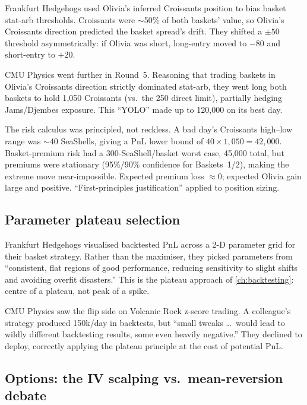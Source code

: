 Frankfurt Hedgehogs used Olivia's inferred Croissants position
to bias basket stat-arb thresholds.  Croissants were $\sim$50\%
of both baskets' value, so Olivia's Croissants direction predicted
the basket spread's drift.  They shifted a $\pm 50$ threshold
asymmetrically: if Olivia was short, long-entry moved to $-80$
and short-entry to $+20$.

CMU Physics went further in Round~5.  Reasoning that trading
baskets in Olivia's Croissants direction strictly dominated
stat-arb, they went long both baskets to hold 1{,}050 Croissants
(vs.\ the 250 direct limit), partially hedging Jams/Djembes
exposure.  This ``YOLO'' made up to 120{,}000 on its best day.

The risk calculus was principled, not reckless.  A bad day's
Croissants high--low range was $\sim$40 SeaShells, giving a PnL
lower bound of $40 \times 1{,}050 = 42{,}000$.  Basket-premium
risk had a 300-SeaShell/basket worst case, 45{,}000 total, but
premiums were stationary (95\%/90\% confidence for Baskets~1/2),
making the extreme move near-impossible.  Expected premium loss
$\approx 0$; expected Olivia gain large and positive.
``First-principles justification'' applied to position sizing.

\subsection{Parameter plateau selection}
\label{sec:param_plateau}

Frankfurt Hedgehogs visualised backtested PnL across a 2-D
parameter grid for their basket strategy.  Rather than the
maximiser, they picked parameters from ``consistent, flat regions
of good performance, reducing sensitivity to slight shifts and
avoiding overfit disasters.''  This is the plateau approach of
\cref{ch:backtesting}: centre of a plateau, not peak of a spike.

CMU Physics saw the flip side on Volcanic Rock z-score trading.
A colleague's strategy produced 150k/day in backtests, but
``small tweaks \ldots\ would lead to wildly different backtesting
results, some even heavily negative.''  They declined to deploy,
correctly applying the plateau principle at the cost of potential
PnL.

\subsection{Options: the IV scalping vs.\ mean-reversion debate}
\label{sec:options_debate}

